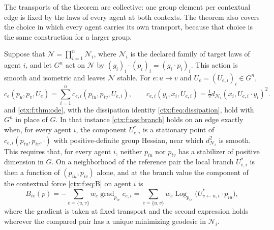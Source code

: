 The transports of the theorem are collective: one group element per contextual edge is fixed by the laws of every agent at both contexts. The theorem also covers the choice in which every agent carries its own transport, because that choice is the same construction for a larger group.

Suppose that $\mathcal N=\prod_{i=1}^n\mathcal N_i$, where $\mathcal N_i$ is the declared family of target laws of agent $i$, and let $G^n$ act on $\mathcal N$ by $(g_i)_i\cdot(p_i)_i=(g_i\cdot p_i)_i$. This action is smooth and isometric and leaves $\mathcal N$ stable. For $e:u\to v$ and $U_e=(U_{e,i})_i\in G^n$,
\begin{equation}
 c_e(p_u,p_v,U_e)=\sum_{i=1}^n c_{e,i}(p_{iu},p_{iv},U_{e,i}),\qquad
 c_{e,i}(y_i,x_i,U_{e,i})=\tfrac12d_{\mathcal N_i}(x_i,U_{e,i}\cdot y_i)^2.
 \label{ctx:f:eq:agentwise-cost}
\end{equation}
 and \cref{ctx:f:thm:ode}, with the dissipation identity \cref{ctx:f:eq:dissipation}, hold with $G^n$ in place of $G$. In that instance \cref{ctx:f:ass:branch} holds on an edge exactly when, for every agent $i$, the component $U_{e,i}^*$ is a stationary point of $c_{e,i}(p_{iu},p_{iv},\cdot)$ with positive-definite group Hessian, near which $d_{\mathcal N_i}^2$ is smooth. This requires that, for every agent $i$, neither $p_{iu}$ nor $p_{iv}$ has a stabilizer of positive dimension in $G$. On a neighborhood of the reference pair the local branch $U_{e,i}^*$ is then a function of $(p_{iu},p_{iv})$ alone, and at the branch value the component of the contextual force \cref{ctx:f:eq:B} on agent $i$ is
\begin{equation}
 B_{iv}(p)=-\sum_{e=\{u,v\}}w_e\operatorname{grad}_{p_{iv}}c_{e,i}
 =\sum_{e=\{u,v\}}w_e\operatorname{Log}_{p_{iv}}\bigl(U^*_{v\leftarrow u,i}\cdot p_{iu}\bigr),
 \label{ctx:f:eq:agentwise-force}
\end{equation}
where the gradient is taken at fixed transport and the second expression holds wherever the compared pair has a unique minimizing geodesic in $\mathcal N_i$.

